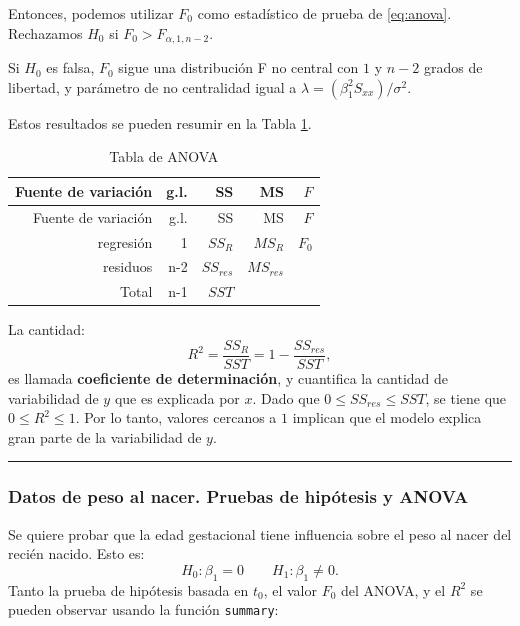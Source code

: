 \documentclass[
]{article}
\begin{document}
Entonces, podemos utilizar \(F_{0}\) como estadístico de prueba de \eqref{eq:anova}. Rechazamos \(H_{0}\) si \(F_{0} > F_{\alpha,1,n-2}\).

Si \(H_{0}\) es falsa, \(F_{0}\) sigue una distribución F no central con \(1\) y \(n-2\) grados de libertad, y parámetro de no centralidad igual a \(\lambda=(\beta_{1}^{2}S_{xx})/\sigma^{2}\).

Estos resultados se pueden resumir en la Tabla \ref{tab:tableAnova}.

\begin{longtable}[]{@{}rrrrr@{}}
\caption{\label{tab:tableAnova} Tabla de ANOVA}\tabularnewline
\toprule\noalign{}
Fuente de variación & g.l. & SS & MS & \(F\) \\
\midrule\noalign{}
\endfirsthead
\toprule\noalign{}
Fuente de variación & g.l. & SS & MS & \(F\) \\
\midrule\noalign{}
\endhead
\bottomrule\noalign{}
\endlastfoot
regresión & 1 & \(SS_{R}\) & \(MS_{R}\) & \(F_{0}\) \\
residuos & n-2 & \(SS_{res}\) & \(MS_{res}\) & \\
Total & n-1 & \(SST\) & & \\
\end{longtable}

La cantidad:
\[
R^{2} = \frac{SS_{R}}{SST} = 1 - \frac{SS_{res}}{SST},
\]
es llamada \textbf{coeficiente de determinación}, y cuantifica la cantidad de variabilidad de \(y\) que es explicada por \(x\). Dado que \(0 \leq SS_{res} \leq SST\), se tiene que \(0 \leq R^{2} \leq 1\). Por lo tanto, valores cercanos a \(1\) implican que el modelo explica gran parte de la variabilidad de \(y\).

\rule{\textwidth}{0.4pt}

\hypertarget{datos-de-peso-al-nacer.-pruebas-de-hipuxf3tesis-y-anova}{%
\subsubsection*{Datos de peso al nacer. Pruebas de hipótesis y ANOVA}\label{datos-de-peso-al-nacer.-pruebas-de-hipuxf3tesis-y-anova}}

Se quiere probar que la edad gestacional tiene influencia sobre el peso al nacer del recién nacido. Esto es:
\[
H_{0}: \beta_{1} = 0 \qquad H_{1}: \beta_{1} \neq 0. 
\]
Tanto la prueba de hipótesis basada en \(t_{0}\), el valor \(F_{0}\) del ANOVA, y el \(R^{2}\) se pueden observar usando la función \texttt{summary}:
\end{document}
